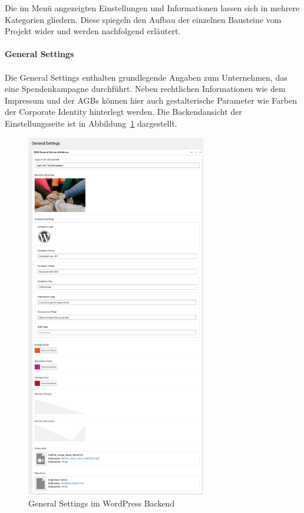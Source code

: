 Die im Menü angezeigten Einstellungen und Informationen lassen sich in mehrere Kategorien gliedern.
Diese spiegeln den Aufbau der einzelnen Bausteine vom Projekt wider und werden nachfolgend erläutert.
\\\\
\textbf{General Settings}\\\\
Die General Settings enthalten grundlegende Angaben zum Unternehmen, das eine Spendenkampagne durchführt.
Neben rechtlichen Informationen wie dem Impressum und der AGBs können hier auch gestalterische Parameter wie Farben der Corporate Identity hinterlegt werden.
Die Backendansicht der Einstellungsseite ist in Abbildung~\ref{fig:charigame-general-settings-legacy} dargestellt.
\begin{figure}[H]
    \centering
    \includegraphics[width=0.7\textwidth]{images/legacy_general_settings}
    \caption{General Settings im WordPress Backend}
    \label{fig:charigame-general-settings-legacy}
\end{figure}

